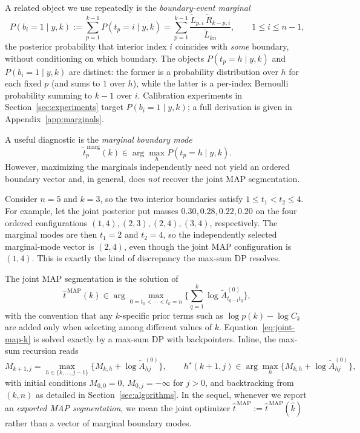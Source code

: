 \begin{remark}
\label{rem:boundary-event}
A related object we use repeatedly is the \emph{boundary-event marginal}
\begin{equation}
P(b_i=1\mid y,k)
 := \sum_{p=1}^{k-1} P(t_p=i\mid y,k)
 = \sum_{p=1}^{k-1}\frac{\widetilde{L}_{p,i}\,\widetilde{R}_{k-p,i}}{\widetilde{L}_{k n}},
 \qquad 1\le i\le n-1,
\label{eq:boundary-event}
\end{equation}
the posterior probability that interior index $i$ coincides with \emph{some} boundary, without
conditioning on which boundary. The objects $P(t_p=h\mid y,k)$ and $P(b_i=1\mid y,k)$ are
distinct: the former is a probability distribution over $h$ for each fixed $p$ (and sums to $1$ over
$h$), while the latter is a per-index Bernoulli probability summing to $k-1$ over $i$. Calibration
experiments in Section~\ref{sec:experiments} target $P(b_i=1\mid y,k)$; a full derivation is given
in Appendix~\ref{app:marginals}.
\end{remark}

A useful diagnostic is the \emph{marginal boundary mode}
\[
\widetilde{t}^{\,\mathrm{marg}}_p(k)
  \in \arg\max_h P(t_p=h\mid y,k).
\]
However, maximizing the marginals independently need not yield an ordered boundary vector and, in
general, does \emph{not} recover the joint MAP segmentation.

\begin{remark}
\label{rem:marg-vs-joint}
Consider $n=5$ and $k=3$, so the two interior boundaries satisfy $1\le t_1<t_2\le4$.
For example, let the joint posterior put masses $0.30,0.28,0.22,0.20$ on the four ordered
configurations $(1,4),(2,3),(2,4),(3,4)$, respectively. The marginal modes are then
$t_1=2$ and $t_2=4$, so the independently selected marginal-mode vector is $(2,4)$, even though
the joint MAP configuration is $(1,4)$. This is exactly the kind of discrepancy the max-sum DP
resolves.
\end{remark}

The joint MAP segmentation is the solution of
\begin{equation}
\widehat{t}^{\,\mathrm{MAP}}(k)
 \in \arg\max_{0=t_0<\cdots<t_k=n}
 \Bigg\{\sum_{q=1}^k \log \widetilde{A}^{(0)}_{t_{q-1} t_q}\Bigg\},
\label{eq:joint-map-k}
\end{equation}
with the convention that any $k$-specific prior terms such as $\log p(k)-\log C_k$ are added only
when selecting among different values of $k$. Equation~\eqref{eq:joint-map-k} is solved exactly by
a max-sum DP with backpointers. Inline, the max-sum recursion reads
\begin{equation}
M_{k+1,j} = \max_{h\in\{k,\dots,j-1\}}\big\{M_{k,h} + \log \widetilde{A}^{(0)}_{hj}\big\},
\qquad
h^\star(k+1,j) \in \arg\max_{h} \big\{M_{k,h} + \log \widetilde{A}^{(0)}_{hj}\big\},
\label{eq:max-sum-inline}
\end{equation}
with initial conditions $M_{0,0}=0$, $M_{0,j}=-\infty$ for $j>0$, and backtracking from
$(k,n)$ as detailed in Section~\ref{sec:algorithms}.
In the sequel, whenever we report an \emph{exported MAP segmentation}, we mean the joint optimizer
$\widehat{t}^{\,\mathrm{MAP}}:=\widehat{t}^{\,\mathrm{MAP}}(\widehat{k})$ rather than a vector of marginal
boundary modes.

